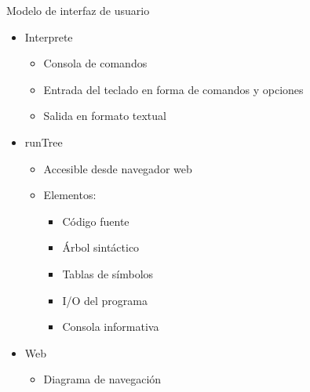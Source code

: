 \documentclass[spanish]{beamer}
\begin{document}
\begin{frame}{Modelo de interfaz de usuario}
   \begin{itemize}
      \item Interprete
      \begin{itemize}
         \item Consola de comandos
         \item Entrada del teclado en forma de comandos y opciones 
         \item Salida en formato textual
      \end{itemize}
      \item runTree
      \begin{itemize}
         \item Accesible desde navegador web
         \item Elementos:
         \begin {itemize}
            \item Código fuente
            \item Árbol sintáctico
            \item Tablas de símbolos
            \item I/O del programa
            \item Consola informativa
         \end {itemize}
      \end{itemize}
      \item Web
      \begin{itemize}
         \item Diagrama de navegación
      \end{itemize}
   \end{itemize}
\end{frame}
\end{document}
